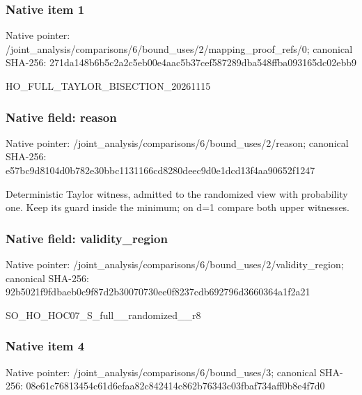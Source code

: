 \documentclass[10pt,a4paper]{article}
\begin{document}
\subsubsection{Native item 1}
Native pointer: /joint\_\allowbreak{}analysis/comparisons/6/bound\_\allowbreak{}uses/2/mapping\_\allowbreak{}proof\_\allowbreak{}refs/0; canonical SHA-256: 271da148b6b5c2a2c5eb00e4aac5b37cef587289dba548ffba093165dc02ebb9

\begingroup\raggedright\sloppy HO\_\allowbreak{}FULL\_\allowbreak{}TAYLOR\_\allowbreak{}BISECTION\_\allowbreak{}20261115\par\endgroup

\subsubsection{Native field: reason}
Native pointer: /joint\_\allowbreak{}analysis/comparisons/6/bound\_\allowbreak{}uses/2/reason; canonical SHA-256: e57bc9d8104d0b782e30bbc1131166cd8280deec9d0e1dcd13f4aa90652f1247

\begingroup\raggedright\sloppy Deterministic Taylor witness,\allowbreak{} admitted to the randomized view with probability one. Keep its guard inside the minimum;\allowbreak{} on d=\allowbreak{}1 compare both upper witnesses.\par\endgroup

\subsubsection{Native field: validity\_\allowbreak{}region}
Native pointer: /joint\_\allowbreak{}analysis/comparisons/6/bound\_\allowbreak{}uses/2/validity\_\allowbreak{}region; canonical SHA-256: 92b5021f9fdbaeb0c9f87d2b30070730ee0f8237cdb692796d3660364a1f2a21

\begingroup\raggedright\sloppy SO\_\allowbreak{}HO\_\allowbreak{}HOC07\_\allowbreak{}S\_\allowbreak{}full\_\allowbreak{}\_\allowbreak{}randomized\_\allowbreak{}\_\allowbreak{}r8\par\endgroup

\subsubsection{Native item 4}
Native pointer: /joint\_\allowbreak{}analysis/comparisons/6/bound\_\allowbreak{}uses/3; canonical SHA-256: 08e61c76813454c61d6efaa82c842414c862b76343c03fbaf734aff0b8e4f7d0
\end{document}
